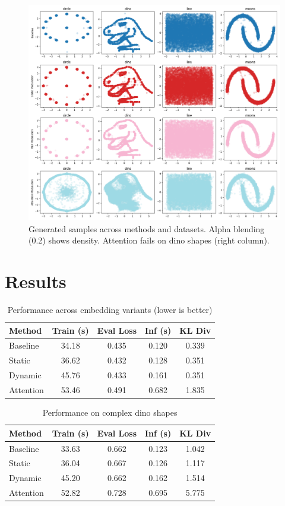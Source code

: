 \documentclass{article} %
\begin{document}
\begin{figure}[t]
    \centering
    \includegraphics[width=\textwidth]{generated_images.png}
    \caption{Generated samples across methods and datasets. Alpha blending (0.2) shows density. Attention fails on dino shapes (right column).}
    \label{fig:generated_samples}
\end{figure}

\section{Results}
\label{sec:results}

\begin{table}[t]
\centering
\caption{Performance across embedding variants (lower is better)}
\small
\begin{tabular}{lcccc}
\toprule
Method & Train (s) & Eval Loss & Inf (s) & KL Div \\
\midrule
Baseline & 34.18 & 0.435 & 0.120 & 0.339 \\
Static & 36.62 & 0.432 & 0.128 & 0.351 \\
Dynamic & 45.76 & 0.433 & 0.161 & 0.351 \\
Attention & 53.46 & 0.491 & 0.682 & 1.835 \\
\bottomrule
\end{tabular}
\label{tab:circle_results}
\end{table}

\begin{table}[t]
\centering
\caption{Performance on complex dino shapes}
\small
\begin{tabular}{lcccc}
\toprule
Method & Train (s) & Eval Loss & Inf (s) & KL Div \\
\midrule
Baseline & 33.63 & 0.662 & 0.123 & 1.042 \\
Static & 36.04 & 0.667 & 0.126 & 1.117 \\
Dynamic & 45.20 & 0.662 & 0.162 & 1.514 \\
Attention & 52.82 & 0.728 & 0.695 & 5.775 \\
\bottomrule
\end{tabular}
\label{tab:dino_results}
\end{table}
\end{document}
